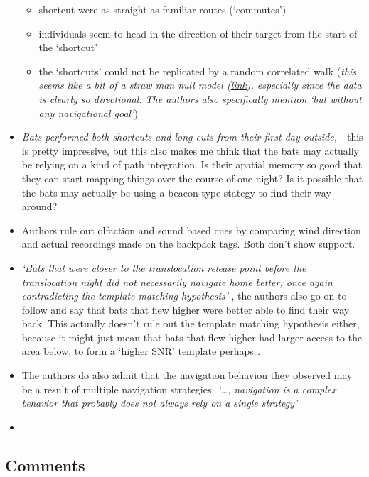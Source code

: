 \documentclass[
]{book}
\providecommand{\tightlist}{%
  \setlength{\itemsep}{0pt}\setlength{\parskip}{0pt}}
\begin{document}
\begin{itemize}
  \begin{itemize}
  \tightlist
  \item
    shortcut were as straight as familiar routes (`commutes')
  \item
    individuals seem to head in the direction of their target from the start of the `shortcut'
  \item
    the `shortcuts' could not be replicated by a random correlated walk (\emph{this seems like a bit of a straw man null model (\href{https://www.fharrell.com/post/nhst-never/}{link}), especially since the data is clearly so directional. The authors also specifically mention `but without any navigational goal'})
  \end{itemize}
\item
  \emph{Bats performed both shortcuts and long-cuts from their first day outside,} - this is pretty impressive, but this also makes me think that the bats may actually be relying on a kind of path integration. Is their apatial memory so good that they can start mapping things over the course of one night? Is it possible that the bats may actually be using a beacon-type stategy to find their way around?
\item
  Authors rule out olfaction and sound based cues by comparing wind direction and actual recordings made on the backpack tags. Both don't show support.
\item
  \emph{`Bats that were closer to the translocation release point before the translocation night did not necessarily navigate home better, once again contradicting the template-matching hypothesis'} , the authors also go on to follow and say that bats that flew higher were better able to find their way back. This actually doesn't rule out the template matching hypothesis either, because it might just mean that bats that flew higher had larger access to the area below, to form a `higher SNR' template perhaps\ldots{}
\item
  The authors do also admit that the navigation behaviou they observed may be a result of multiple navigation strategies: \emph{`\ldots, navigation is a complex behavior that probably does not always rely on a single strategy'}
\item
\end{itemize}

\hypertarget{comments}{%
\subsection{Comments}\label{comments}}
\end{document}
